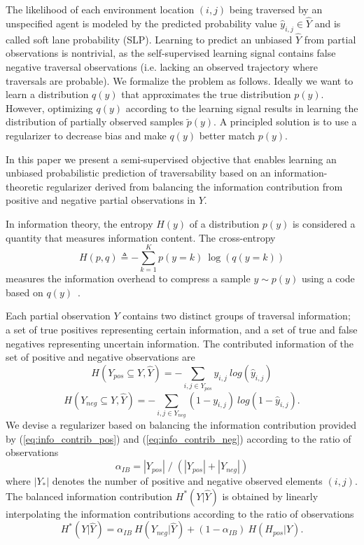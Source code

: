 \documentclass[letterpaper, 10 pt, conference]{ieeeconf}
\begin{document}
The likelihood of each environment location $(i,j)$ being traversed by an unspecified agent is modeled by the predicted probability value $\hat{y}_{i,j} \in \hat{Y}$ and is called soft lane probability (SLP). Learning to predict an unbiased $\hat{Y}$ from partial observations is nontrivial, as the self-supervised learning signal contains false negative traversal observations (i.e. lacking an observed trajectory where traversals are probable). We formalize the problem as follows. Ideally we want to learn a distribution $q(y)$ that approximates the true distribution $p(y)$. However, optimizing $q(y)$ according to the learning signal results in learning the distribution of partially observed samples $\tilde{p}(y)$. A principled solution is to use a regularizer to decrease bias and make $q(y)$ better match $p(y)$.

In this paper we present a semi-supervised objective that enables learning an unbiased probabilistic prediction of traversability based on an information-theoretic regularizer derived from balancing the information contribution from positive and negative partial observations in $Y$.

In information theory, the entropy $H(y)$ of a distribution $p(y)$ is considered a quantity that measures information content. The cross-entropy
\begin{equation}
    H(p,q) \triangleq - \sum_{k=1}^K p(y=k) \: \log ( q(y=k) )
\end{equation}
\noindent measures the information overhead to compress a sample $y \sim p(y)$ using a code based on $q(y)$~\cite{murphy2022pml1}.

Each partial observation $Y$ contains two distinct groups of traversal information; a set of true positives representing certain information, and a set of true and false negatives representing uncertain information. The contributed information of the set of positive and negative observations are
\begin{equation}
    H(Y_{pos} \subseteq Y, \hat{Y}) = - \sum_{i,j \in Y_{pos}} y_{i,j} \: log ( \hat{y}_{i,j} )
\label{eq:info_contrib_pos}
\end{equation}
\begin{equation}
    H(Y_{neg} \subseteq Y, \hat{Y}) = - \sum_{i,j \in Y_{neg}} (1-y_{i,j}) \: log ( 1 - \hat{y}_{i,j} ).
\label{eq:info_contrib_neg}
\end{equation}
\noindent We devise a regularizer based on balancing the information contribution provided by (\ref{eq:info_contrib_pos}) and (\ref{eq:info_contrib_neg}) according to the ratio of observations
\begin{equation}
    \alpha_{IB} = |Y_{pos}| \; / \; (|Y_{pos}| + |Y_{neg}|)
\label{eq:alpha_sla}
\end{equation}
where $|Y_{*}|$ denotes the number of positive and negative observed elements $(i,j)$. The balanced information contribution $H^*(Y|\hat{Y})$ is obtained by linearly interpolating the information contributions according to the ratio of observations
\begin{equation}
    H^*(Y|\hat{Y}) = \alpha_{IB} \: H(Y_{neg}|\hat{Y}) + (1-\alpha_{IB}) \: H(H_{pos}|Y).
\end{equation}
\end{document}
